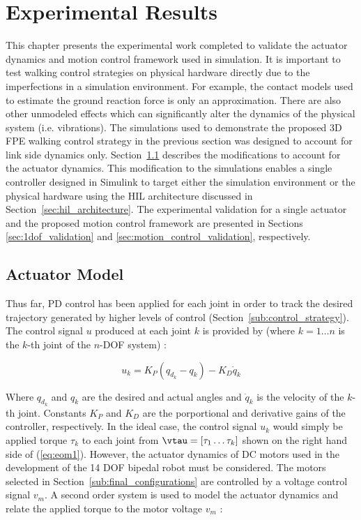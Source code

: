 \chapter{Experimental Results} %
\label{cha:experiments}

This chapter presents the experimental work completed to validate the actuator dynamics and motion control framework used in simulation. It is important to test walking control strategies on physical hardware directly due to the imperfections in a simulation environment. For example, the contact models used to estimate the ground reaction force is only an approximation. There are also other unmodeled effects which can significantly alter the dynamics of the physical system (i.e. vibrations). The simulations used to demonstrate the proposed 3D FPE walking control strategy in the previous section was designed to account for link side dynamics only. Section~\ref{sec:actuator_model} describes the modifications to account for the actuator dynamics. This modification to the simulations enables a single controller designed in Simulink to target either the simulation environment or the physical hardware using the HIL architecture discussed in Section~\ref{sec:hil_architecture}. The experimental validation for a single actuator and the proposed motion control framework are presented in Sections \ref{sec:1dof_validation} and \ref{sec:motion_control_validation}, respectively. 

\section{Actuator Model} %
\label{sec:actuator_model}
Thus far, PD control has been applied for each joint in order to track the desired trajectory generated by higher levels of control (Section~\ref{sub:control_strategy}). The control signal $u$ produced at each joint $k$ is provided by (where $k = 1 \ldots n$ is the $k$-th joint of the $n$-DOF system) : 

\begin{equation}
	{u_k} = {K_P}({q_{d_k}} - {q_k}) - {K_D}{\dot q_k}
	\label{eq:pdcontrollaw}
\end{equation} 

Where ${q_{d_k}}$ and ${q_k}$ are the desired and actual angles and ${\dot q_k}$ is the velocity of the $k$-th joint. Constants ${K_P}$ and ${K_D}$ are the porportional and derivative gains of the controller, respectively. In the ideal case, the control signal ${u_k}$ would simply be applied torque ${\tau _k}$ to each joint from $\vtau = \left[\tau _1 \ldots \tau _k \right]$ shown on the right hand side of (\ref{eq:eom1}). However, the actuator dynamics of DC motors used in the development of the 14 DOF bipedal robot must be considered. The motors selected in Section~\ref{sub:final_configurations} are controlled by a voltage control signal $v_{m}$. A second order system is used to model the actuator dynamics and relate the applied torque to the motor voltage $v _m$ \cite{Spong2008}: 

